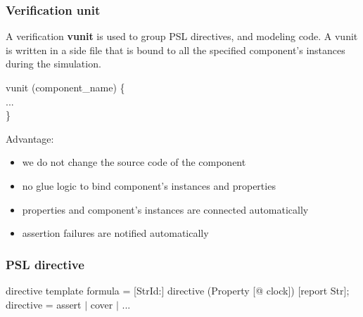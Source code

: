 \documentclass{beamer}
\begin{document}
\begin{frame}

\frametitle{Verification unit}

A verification \textbf{vunit} is used to group PSL directives, and modeling code.
A vunit is written in a side file that is bound to all the specified component's 
instances during the simulation.
\begin{block}{}
	vunit (component\_name) \{\\
	...\\
	\}
\end{block}

Advantage:\\
\begin{itemize}
	\item 
	we do not change the source code of the component
	\item
	no glue logic to bind component's instances and properties
	\item
	properties and component's instances are connected automatically
	\item
	assertion failures are notified automatically 
\end{itemize}

\end{frame}


\begin{frame}

\frametitle{PSL directive}

\begin{block}{directive template}
formula = [StrId:] directive (Property [@ clock]) [report Str];\\
directive = assert $|$ cover $|$ ...
\end{block}

\end{frame}
\end{document}
